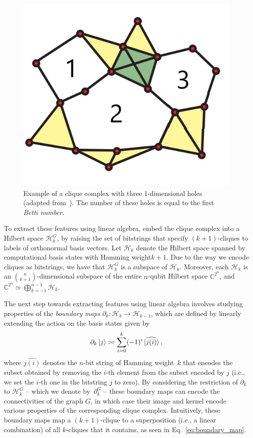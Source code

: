 \documentclass[a4paper, onecolumn, accepted=2022-08-28]{quantumarticle}
\begin{document}
\begin{figure}
    \centering
    \includegraphics[width=.6\linewidth]{holes.png}
    \caption{\label{fig:holes} Example of a clique complex with three 1-dimensional holes (adapted from~\cite{ghrist:barcodes}).
    The number of these holes is equal to the first \emph{Betti number}.}
\end{figure}

To extract these features using linear algebra, embed the clique complex into a Hilbert space $\mathcal{H}_k^G$, by raising the set of bitstrings that specify $(k+1)$-cliques to labels of orthonormal basis vectors.
Let $\mathcal{H}_k$ denote the Hilbert space spanned by computational basis states with Hamming weight\footnotemark[3] $k+1$.
Due to the way we encode cliques as bitstrings, we have that $\mathcal{H}_k^G$ is a subspace of  $\mathcal{H}_k$.
Moreover, each $\mathcal{H}_k$ is an $\binom{n}{k+1}$-dimensional subspace of the entire $n$-qubit Hilbert space $\mathbb{C}^{2^n}$, and $\mathbb{C}^{2^n} \simeq \bigoplus_{k=-1}^{n-1}\mathcal{H}_k$.


The next step towards extracting features using linear algebra involves studying properties of the \emph{boundary maps} $\partial_k :\mathcal{H}_k  \rightarrow \mathcal{H}_{k-1}$, which are defined by linearly extending the action on the basis states given by
\begin{align}
  \partial_k\ket{j} \coloneqq \sum_{i = 0}^{k}(-1)^i\ket{\widehat{j(i)}},
  \label{eq:boundary_map}
\end{align}
where $\widehat{j(i)}$ denotes the $n$-bit string of Hamming weight~$k$ that encodes the subset obtained by removing the $i$-th element from the subset encoded by $j$ (i.e., we set the $i$-th one in the bitstring $j$ to zero).
By considering the restriction of $\partial_k$ to $\mathcal{H}_k^G$ -- which we denote by~$\partial^G_k$ -- these boundary maps can encode the connectivities of the graph $G$, in which case their image and kernel encode various properties of the corresponding clique complex. 
Intuitively, these boundary maps map a $(k+1)$-clique to a superposition (i.e., a linear combination) of all $k$-cliques that it contains, as seen in Eq.~\eqref{eq:boundary_map}.
\end{document}
